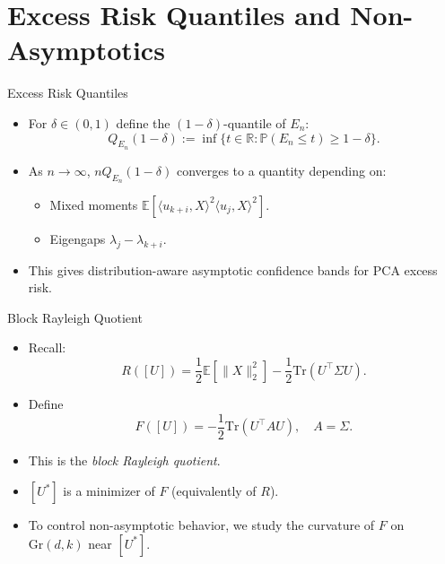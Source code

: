 \documentclass{beamer}
\newcommand{\R}{\mathbb{R}}
\newcommand{\Gr}{\mathrm{Gr}}
\newcommand{\E}{\mathbb{E}}
\newcommand{\1}{\mathbbm{1}}
\begin{document}
\section{Excess Risk Quantiles and Non-Asymptotics}

\begin{frame}{Excess Risk Quantiles} %
  \begin{itemize}
    \item For $\delta \in (0,1)$ define the $(1-\delta)$-quantile of $E_n$:
    \[
      Q_{E_n}(1-\delta)
      := \inf\{ t \in \R : \mathbb{P}(E_n \le t) \ge 1-\delta \}.
    \]
    \item As $n \to \infty$, $n Q_{E_n}(1-\delta)$ converges to
    a quantity depending on:
    \begin{itemize}
      \item Mixed moments
      $\E[\langle u_{k+i}, X\rangle^2 \langle u_j, X\rangle^2]$.
      \item Eigengaps $\lambda_j - \lambda_{k+i}$.
    \end{itemize}
    \item This gives distribution-aware asymptotic confidence bands for PCA excess risk.
  \end{itemize}
\end{frame}

\begin{frame}{Block Rayleigh Quotient} %
  \begin{itemize}
    \item Recall:
    \[
      R([U]) = \frac{1}{2}\E[\|X\|_2^2] - \frac{1}{2}\mathrm{Tr}(U^\top \Sigma U).
    \]
    \item Define
    \[
      F([U]) = -\frac{1}{2}\mathrm{Tr}(U^\top A U),
      \quad A = \Sigma.
    \]
    \item This is the \emph{block Rayleigh quotient}.
    \item $[U^\ast]$ is a minimizer of $F$ (equivalently of $R$).
    \item To control non-asymptotic behavior, we study the curvature of $F$
    on $\Gr(d,k)$ near $[U^\ast]$.
  \end{itemize}
\end{frame}
\end{document}
